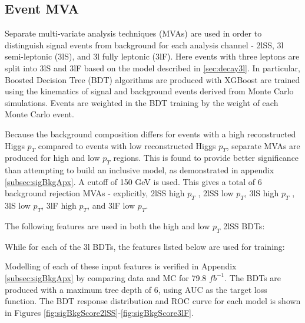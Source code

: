 
\subsection{Event MVA}
\label{subsec:sigBkgMVA}

Separate multi-variate analysis techniques (MVAs) are used in order to distinguish signal events from background for each analysis channel - 2lSS, 3l semi-leptonic (3lS), and 3l fully leptonic (3lF). Here events with three leptons are split into 3lS and 3lF based on the model described in \ref{sec:decay3l}. In particular, Boosted Decision Tree (BDT) algorithms are produced with XGBoost \cite{xgboost} are trained using the kinematics of signal and background events derived from Monte Carlo simulations. Events are weighted in the BDT training by the weight of each Monte Carlo event. 

Because the background composition differs for events with a high reconstructed Higgs $p_T$ compared to events with low reconstructed Higgs $p_T$, separate MVAs are produced for high and low $p_T$ regions. This is found to provide better significance than attempting to build an inclusive model, as demonstrated in appendix \ref{subsec:sigBkgApx}. A cutoff of 150 GeV is used. This gives a total of 6 background rejection MVAs - explicitly, 2lSS high $p_T$ , 2lSS low $p_T$, 3lS high $p_T$ , 3lS low $p_T$, 3lF high $p_T$, and 3lF low $p_T$.

The following features are used in both the high and low $p_T$ 2lSS BDTs:

\begin{table}[H]

\end{table}

While for each of the 3l BDTs, the features listed below are used for training:

\begin{table}[H]

\end{table}

Modelling of each of these input features is verified in Appendix \ref{subsec:sigBkgApx} by comparing data and MC for 79.8 $fb^{-1}$. The BDTs are produced with a maximum tree depth of 6, using AUC as the target loss function. The BDT response distribution and ROC curve for each model is shown in Figures \ref{fig:sigBkgScore2lSS}-\ref{fig:sigBkgScore3lF}.

